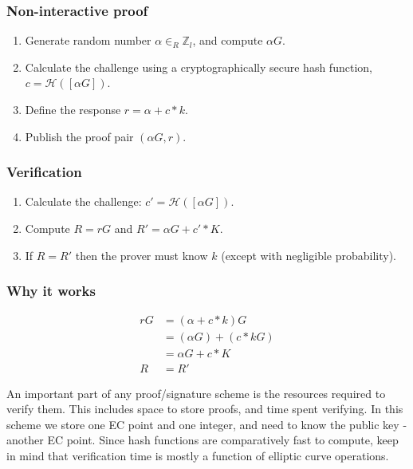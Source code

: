 \subsubsection*{Non-interactive proof}

\begin{enumerate}
	\item Generate random number $\alpha \in_R \mathbb{Z}_l$, and compute $\alpha G$.
	\item Calculate the challenge using a cryptographically secure hash function, \(c = \mathcal{H}([\alpha G])\).
	\item Define the response $r = \alpha + c*k$.
	\item Publish the proof pair $(\alpha G, r)$.
\end{enumerate}

\subsubsection*{Verification}

\begin{enumerate}
	\item Calculate the challenge: \(c' = \mathcal{H}([\alpha G])\).
	\item Compute $R = r G$ and $R' = \alpha G + c'*K$.
	\item If $R = R'$ then the prover must know $k$ (except with negligible probability).
\end{enumerate}

\subsubsection*{Why it works}

\begin{align*}
r G &= (\alpha + c*k) G \\
	&= (\alpha G) + (c*k G) \\
	&= \alpha G + c*K \\
  R &= R'
\end{align*}

An important part of any proof/signature scheme is the resources required to verify them. This includes space to store proofs, and time spent verifying. In this scheme we store one EC point and one integer, and need to know the public key - another EC point. Since hash functions are comparatively fast to compute, keep in mind that verification time is mostly a function of elliptic curve operations.


